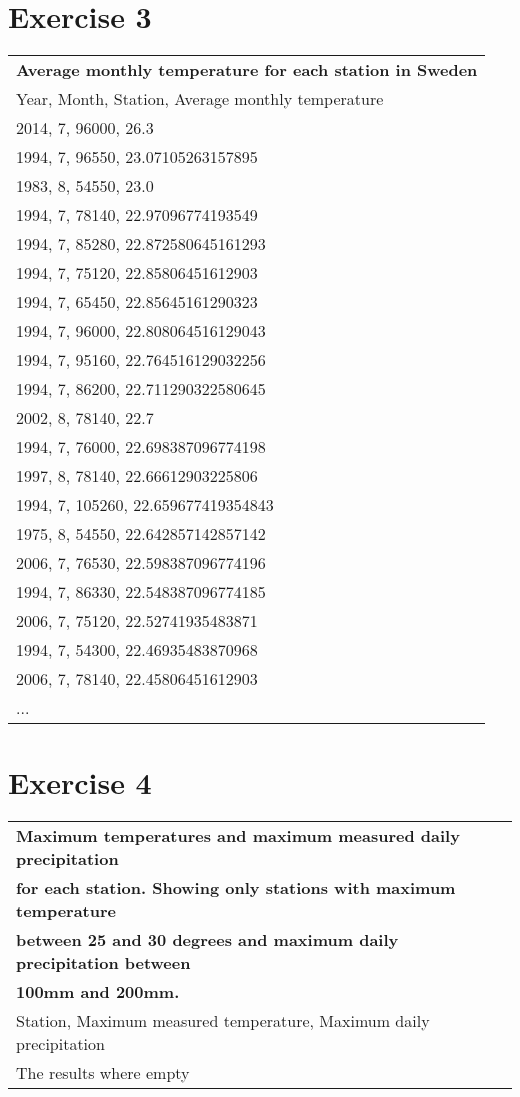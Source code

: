 \documentclass[a4paper,titlepage,12pt]{article}
\begin{document}
\section{Exercise 3}
\begin{tabular}{l}
  \bf Average monthly temperature for each station in Sweden \\ 
  Year, Month, Station, Average monthly temperature \\
  \hline
 2014,    7,  96000,               26.3\\ 
 1994,    7,  96550,  23.07105263157895\\ 
 1983,    8,  54550,               23.0\\
 1994,    7,  78140,  22.97096774193549\\
 1994,    7,  85280, 22.872580645161293\\
 1994,    7,  75120,  22.85806451612903\\
 1994,    7,  65450,  22.85645161290323\\
 1994,    7,  96000, 22.808064516129043\\
 1994,    7,  95160, 22.764516129032256\\
 1994,    7,  86200, 22.711290322580645\\
 2002,    8,  78140,               22.7\\
 1994,    7,  76000, 22.698387096774198\\
 1997,    8,  78140,  22.66612903225806\\
 1994,    7, 105260, 22.659677419354843\\
 1975,    8,  54550, 22.642857142857142\\
 2006,    7,  76530, 22.598387096774196\\
 1994,    7,  86330, 22.548387096774185\\
 2006,    7,  75120,  22.52741935483871\\
 1994,    7,  54300,  22.46935483870968\\
 2006,    7,  78140,  22.45806451612903\\
  ... \\ 
\end{tabular}

\section{Exercise 4}
\begin{tabular}{l}
  \bf Maximum temperatures and maximum measured daily precipitation \\
  \bf for each station. Showing only stations with maximum temperature \\
  \bf between 25 and 30 degrees and maximum daily precipitation between \\
  \bf 100mm and 200mm. \\
  Station, Maximum measured temperature, Maximum daily precipitation \\
  \hline
  The results where empty \\ 
\end{tabular}
\end{document}
